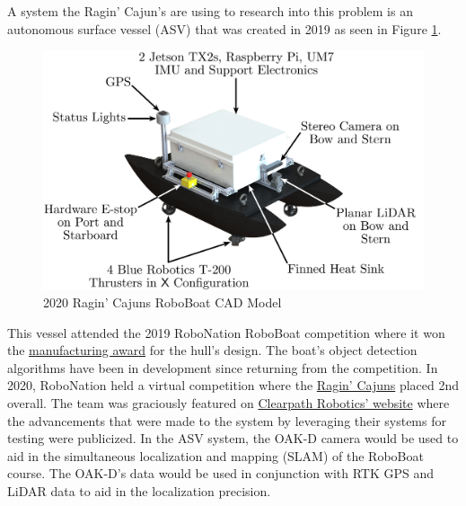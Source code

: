 \documentclass[letterpaper, 12 pt, conference]{ieeeconf}
\begin{document}
A system the Ragin' Cajun's are using to research into this problem is an autonomous surface vessel (ASV) that was created in 2019 as seen in Figure \ref{fig:RoboBoat}. 
%
\begin{figure}[tb]
\centering
\includegraphics[width=\columnwidth]{Figures/Catamaran_Final_Render_3.pdf}
\caption{2020 Ragin' Cajuns RoboBoat CAD Model}
\label{fig:RoboBoat}
\end{figure}
%
This vessel attended the 2019 RoboNation RoboBoat competition where it won the \hyperlink{https://mechanical.louisiana.edu/news-events/news/20190627/university-team-earns-manufacturing-award-international-roboboat}{manufacturing award} for the hull’s design. The boat’s object detection algorithms have been in development since returning from the competition. 
In 2020, RoboNation held a virtual competition where the \hyperlink{https://crawlab.github.io/RoboBoat-2020/} {Ragin’ Cajuns} placed 2nd overall. The team was graciously featured on \hyperlink{https://clearpathrobotics.com/blog/2020/11/research-team-uses-clearpath-simulation-in-second-place-finish-at-roboboat-2020/}{Clearpath Robotics’ website} where the advancements that were made to the system by leveraging their systems for testing were publicized. In the ASV system, the OAK-D camera would be used to aid in the simultaneous localization and mapping (SLAM) of the RoboBoat course. The OAK-D’s data would be used in conjunction with RTK GPS and LiDAR data to aid in the localization precision. 
\end{document}
